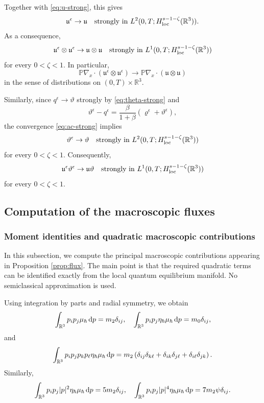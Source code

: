 \documentclass[10pt,reqno]{amsart}
\numberwithin{equation}{section}
\newcommand{\lt}{\left}
\newcommand{\rt}{\right}
\newcommand{\mP}{\mathbb{P}}
\newcommand{\mR}{\mathbb{R}}
\newcommand{\vrh}{\varrho}
\newcommand{\vth}{\vartheta}
\newcommand{\mfu}{\mathfrak{u}}
\newcommand{\intr}{\int_{\mR^3}}
\newcommand{\R}{\mathbb R}
\newcommand{\bq}{\begin{equation}}
\newcommand{\eq}{\end{equation}}
\newcommand{\rdp}{\textnormal{d}p}
\begin{document}
Together with \eqref{eq:u-strong}, this gives
\[
\mfu^\epsilon \to \mfu \quad  \text{strongly in } L^2( 0,T; H^{s-1-\zeta}_{\rm loc}(\R^3)).
\]
As a consequence,
\[
\mfu^\epsilon \otimes \mfu^\epsilon \to \mfu \otimes \mfu \quad \text{strongly in } L^1( 0,T; H^{s-1-\zeta}_{\rm loc}(\R^3))
\]
for every $0<\zeta<1$. In particular,
\bq
\label{eq:u-conv}
\mP \nabla_x\cdot \lt( \mfu^\epsilon \otimes \mfu^\epsilon \rt) \to \mP \nabla_x\cdot \lt( \mfu \otimes \mfu \rt)
\eq
in the sense of distributions on $(0,T)\times\R^3$.

Similarly, since $q^\epsilon\to\vth$ strongly by \eqref{eq:theta-strong} and
\[
\vth^\epsilon - q^\epsilon = \frac{\beta}{1+\beta} \lt( \vrh^\epsilon + \vth^\epsilon \rt),
\]
the convergence \eqref{eq:ac-strong} implies
\[
\vth^\epsilon \to \vth \quad \text{strongly in } L^2( 0,T; H^{s-1-\zeta}_{\rm loc}(\R^3))
\]
for every $0<\zeta<1$. Consequently,
\bq\label{eq:u-theta}
\mfu^\epsilon \vth^\epsilon \to \mfu \vth \quad \text{strongly in } L^1( 0,T; H^{s-1-\zeta}_{\rm loc}(\R^3))
\eq
for every $0<\zeta<1$.



 
%
%
%
%
%
%
%
%
%
%
\subsection{Computation of the macroscopic fluxes}\label{ssec:flux-comp}
%
%
%
%
%
%
%
%
%
%
\subsubsection{Moment identities and quadratic macroscopic contributions}

In this subsection, we compute the principal macroscopic contributions appearing in Proposition \ref{prop:flux}. The main point is that the required quadratic terms can be identified exactly from the local quantum equilibrium manifold. No semiclassical approximation is used.

 
Using integration by parts and radial symmetry, we obtain
\bq\label{eq:mom-id1}
\intr p_ip_j\mu_\hbar\,\rdp = m_2 \delta_{ij}, \quad \intr p_ip_j\eta_\hbar\mu_\hbar\,\rdp = m_0 \delta_{ij},
\eq
and
\bq\label{eq:mom-id2}
\intr p_ip_jp_kp_\ell\eta_\hbar\mu_\hbar\,\rdp = m_2  \lt( \delta_{ij}\delta_{k\ell} + \delta_{ik}\delta_{j\ell} + \delta_{i\ell}\delta_{jk} \rt).
\eq
Similarly,
\bq\label{eq:mom-id3}
\intr p_ip_j|p|^2\eta_\hbar\mu_\hbar\,\rdp = 5m_2 \delta_{ij}, \quad \intr p_ip_j|p|^4\eta_\hbar\mu_\hbar\,\rdp = 7m_2 \psi \delta_{ij}.
\eq
 
\end{document}
